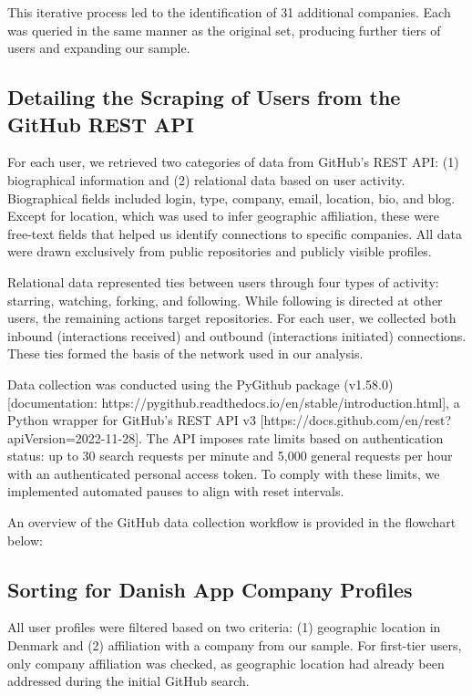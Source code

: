 This iterative process led to the identification of 31 additional companies. Each was queried in the same manner as the original set, producing further tiers of users and expanding our sample.

\subsection{Detailing the Scraping of Users from the GitHub REST API}

For each user, we retrieved two categories of data from GitHub’s REST API: (1) biographical information and (2) relational data based on user activity. Biographical fields included login, type, company, email, location, bio, and blog. Except for location, which was used to infer geographic affiliation, these were free-text fields that helped us identify connections to specific companies. All data were drawn exclusively from public repositories and publicly visible profiles.

Relational data represented ties between users through four types of activity: starring, watching, forking, and following. While following is directed at other users, the remaining actions target repositories. For each user, we collected both inbound (interactions received) and outbound (interactions initiated) connections. These ties formed the basis of the network used in our analysis.

Data collection was conducted using the PyGithub package (v1.58.0) [documentation: https://pygithub.readthedocs.io/en/stable/introduction.html], a Python wrapper for GitHub’s REST API v3 [https://docs.github.com/en/rest?apiVersion=2022-11-28]. The API imposes rate limits based on authentication status: up to 30 search requests per minute and 5,000 general requests per hour with an authenticated personal access token. To comply with these limits, we implemented automated pauses to align with reset intervals.

An overview of the GitHub data collection workflow is provided in the flowchart below:


\subsection{Sorting for Danish App Company Profiles}

All user profiles were filtered based on two criteria: (1) geographic location in Denmark and (2) affiliation with a company from our sample. For first-tier users, only company affiliation was checked, as geographic location had already been addressed during the initial GitHub search.

